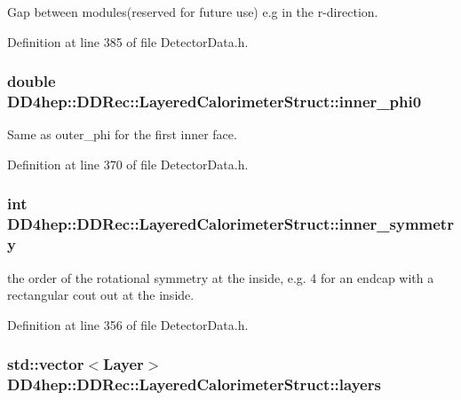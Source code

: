 Gap between modules(reserved for future use) e.g in the r-\/direction. 

Definition at line 385 of file DetectorData.h.\hypertarget{struct_d_d4hep_1_1_d_d_rec_1_1_layered_calorimeter_struct_a5ea761ee743ac216f442d91f97d82516}{
\subsubsection[{inner\_\-phi0}]{\setlength{\rightskip}{0pt plus 5cm}double {\bf DD4hep::DDRec::LayeredCalorimeterStruct::inner\_\-phi0}}}
\label{struct_d_d4hep_1_1_d_d_rec_1_1_layered_calorimeter_struct_a5ea761ee743ac216f442d91f97d82516}
Same as outer\_\-phi for the first inner face. 

Definition at line 370 of file DetectorData.h.\hypertarget{struct_d_d4hep_1_1_d_d_rec_1_1_layered_calorimeter_struct_a94ead288a528b23775bde06ccfd00e99}{
\subsubsection[{inner\_\-symmetry}]{\setlength{\rightskip}{0pt plus 5cm}int {\bf DD4hep::DDRec::LayeredCalorimeterStruct::inner\_\-symmetry}}}
\label{struct_d_d4hep_1_1_d_d_rec_1_1_layered_calorimeter_struct_a94ead288a528b23775bde06ccfd00e99}
the order of the rotational symmetry at the inside, e.g. 4 for an endcap with a rectangular cout out at the inside. 

Definition at line 356 of file DetectorData.h.\hypertarget{struct_d_d4hep_1_1_d_d_rec_1_1_layered_calorimeter_struct_afe938fc0d544b503acde8269461df211}{
\subsubsection[{layers}]{\setlength{\rightskip}{0pt plus 5cm}std::vector$<${\bf Layer}$>$ {\bf DD4hep::DDRec::LayeredCalorimeterStruct::layers}}}
\label{struct_d_d4hep_1_1_d_d_rec_1_1_layered_calorimeter_struct_afe938fc0d544b503acde8269461df211}


